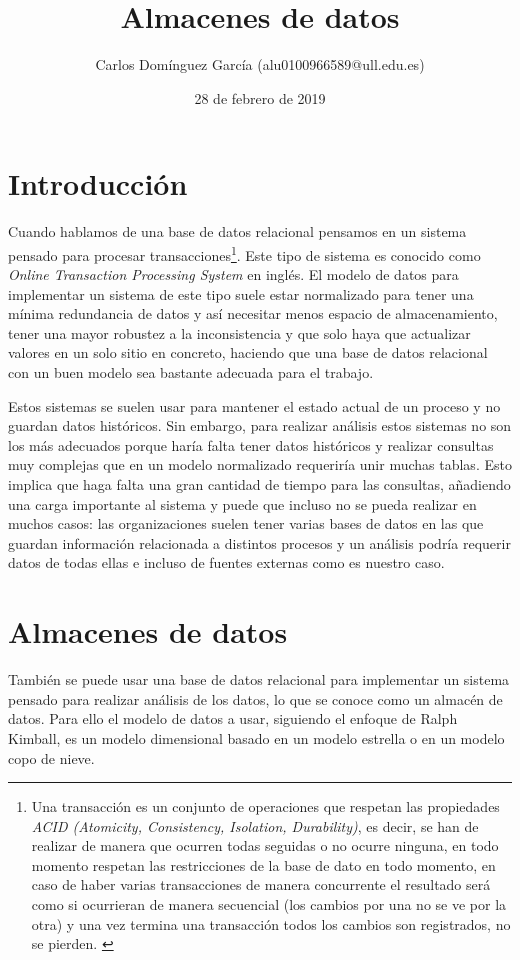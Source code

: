 \documentclass[12pt]{article}
\title{Almacenes de datos}
\author{Carlos Domínguez García (alu0100966589@ull.edu.es)}
\date{28 de febrero de 2019}
\begin{document}
  \maketitle
  \pagebreak
  
  \tableofcontents
  \pagebreak

  \section{Introducción}
    Cuando hablamos de una base de datos relacional pensamos en un sistema pensado para procesar transacciones\footnote{Una transacción es un conjunto de operaciones que respetan las propiedades \textit{ACID (Atomicity, Consistency, Isolation, Durability)}, es decir, se han de realizar de manera que ocurren todas seguidas o no ocurre ninguna, en todo momento respetan las restricciones de la base de dato en todo momento, en caso de haber varias transacciones de manera concurrente el resultado será como si ocurrieran de manera secuencial (los cambios por una no se ve por la otra) y una vez termina una transacción todos los cambios son registrados, no se pierden. \cite{Stackoverflow_AcidAndDatabaseTransactions}}. Este tipo de sistema es conocido como \textit{Online Transaction Processing System} en inglés. El modelo de datos para implementar un sistema de este tipo suele estar normalizado para tener una mínima redundancia de datos y así necesitar menos espacio de almacenamiento, tener una mayor robustez a la inconsistencia y que solo haya que actualizar valores en un solo sitio en concreto, haciendo que una base de datos relacional con un buen modelo sea bastante adecuada para el trabajo.
    
    Estos sistemas se suelen usar para mantener el estado actual de un proceso y no guardan datos históricos. Sin embargo, para realizar análisis estos sistemas no son los más adecuados porque haría falta tener datos históricos y realizar consultas muy complejas que en un modelo normalizado requeriría unir muchas tablas. Esto implica que haga falta una gran cantidad de tiempo para las consultas, añadiendo una carga importante al sistema y puede que incluso no se pueda realizar en muchos casos: las organizaciones suelen tener varias bases de datos en las que guardan información relacionada a distintos procesos y un análisis podría requerir datos de todas ellas e incluso de fuentes externas como es nuestro caso.
  
  \section{Almacenes de datos}
    También se puede usar una base de datos relacional para implementar un sistema pensado para realizar análisis de los datos, lo que se conoce como un almacén de datos. Para ello el modelo de datos a usar, siguiendo el enfoque de Ralph Kimball, es un modelo dimensional basado en un modelo estrella o en un modelo copo de nieve.

  \printbibliography
  
\end{document}
